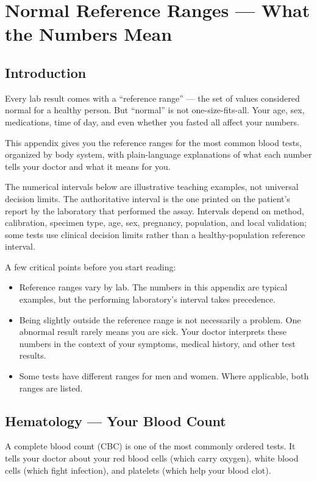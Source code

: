\chapter{Normal Reference Ranges --- What the Numbers Mean}
\label{app:reference_ranges}

\clearpage
\section{Introduction}

Every lab result comes with a ``reference range'' --- the set of values considered normal for a healthy person. But ``normal'' is not one-size-fits-all. Your age, sex, medications, time of day, and even whether you fasted all affect your numbers.

This appendix gives you the reference ranges for the most common blood tests, organized by body system, with plain-language explanations of what each number tells your doctor and what it means for you.

The numerical intervals below are illustrative teaching examples, not universal decision limits. The authoritative interval is the one printed on the patient's report by the laboratory that performed the assay. Intervals depend on method, calibration, specimen type, age, sex, pregnancy, population, and local validation; some tests use clinical decision limits rather than a healthy-population reference interval.

A few critical points before you start reading:
\begin{itemize}
    \item Reference ranges vary by lab. The numbers in this appendix are typical examples, but the performing laboratory's interval takes precedence.
    \item Being slightly outside the reference range is not necessarily a problem. One abnormal result rarely means you are sick. Your doctor interprets these numbers in the context of your symptoms, medical history, and other test results.
    \item Some tests have different ranges for men and women. Where applicable, both ranges are listed.
\end{itemize}

\clearpage
\section{Hematology --- Your Blood Count}

A complete blood count (CBC) is one of the most commonly ordered tests. It tells your doctor about your red blood cells (which carry oxygen), white blood cells (which fight infection), and platelets (which help your blood clot).

